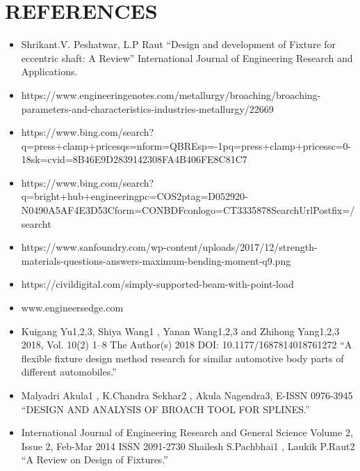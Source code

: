 \documentclass[16pt,a4paper]{article}
\begin{document}
\pagebreak

\section{REFERENCES}

\begin{itemize}
\item Shrikant.V. Peshatwar, L.P Raut “Design and development of Fixture for eccentric shaft: A Review” International Journal of Engineering Research and Applications.
\item https://www.engineeringenotes.com/metallurgy/broaching/broaching-parameters-and-characteristics-industries-metallurgy/22669
\item https://www.bing.com/search?q=press+clamp+pricesqs=nform=QBREsp=-1pq=press+clamp+pricessc=0-18sk=cvid=8B46E9D2839142308FA4B406FE8C81C7
\item https://www.bing.com/search?q=bright+hub+engineeringpc=COS2ptag=D052920-N0490A5AF4E3D53Cform=CONBDFconlogo=CT3335878SearchUrlPostfix=/searcht
\item https://www.sanfoundry.com/wp-content/uploads/2017/12/strength-materials-questions-answers-maximum-bending-moment-q9.png
\item https://civildigital.com/simply-supported-beam-with-point-load
\item www.engineersedge.com
\item Kuigang Yu1,2,3, Shiya Wang1 , Yanan Wang1,2,3 and Zhihong Yang1,2,3  2018, Vol. 10(2) 1–8  The Author(s) 2018 DOI: 10.1177/1687814018761272 “A flexible fixture design method research for similar automotive body parts of different automobiles.”
\item Malyadri Akula1 , K.Chandra Sekhar2 , Akula Nagendra3, E-ISSN 0976-3945 “DESIGN AND ANALYSIS OF BROACH TOOL FOR SPLINES.”
\item International Journal of Engineering Research and General Science Volume 2, Issue 2, Feb-Mar 2014 ISSN 2091-2730 Shailesh S.Pachbhai1 , Laukik P.Raut2 “A Review on Design of Fixtures.”
\end{itemize}
\end{document}
